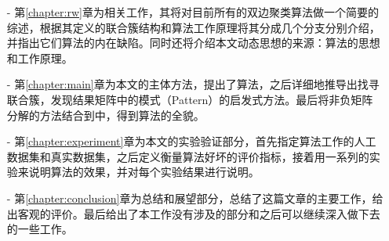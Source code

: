 \begin{itemize}
  \item[-] 第\ref{chapter:rw}章为相关工作，其将对目前所有的双边聚类算法做一个简要的综述，根据其定义的联合簇结构和算法工作原理将其分成几个分支分别介绍，并指出它们算法的内在缺陷。同时还将介绍本文动态思想的来源：\Sync{}算法的思想和工作原理。
  \item[-] 第\ref{chapter:main}章为本文的主体方法，提出了\CoSync{}算法，之后详细地推导出找寻联合簇，发现结果矩阵中的模式（Pattern）的启发式方法。最后将非负矩阵分解的方法结合到\CoSync{}中，得到算法的全貌。
  \item[-] 第\ref{chapter:experiment}章为本文的实验验证部分，首先指定算法工作的人工数据集和真实数据集，之后定义衡量算法好坏的评价指标，接着用一系列的实验来说明\CoSync{}算法的效果，并对每个实验结果进行说明。
  \item[-] 第\ref{chapter:conclusion}章为总结和展望部分，总结了这篇文章的主要工作，给出客观的评价。最后给出了本工作没有涉及的部分和之后可以继续深入做下去的一些工作。


\end{itemize}

